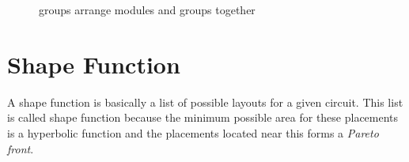 \begin{figure}
	\centering
	\caption{groups arrange modules and groups together}
	\label{fig:group_of_modules}
\end{figure}

\section{Shape Function}
A shape function is basically a list of possible layouts for a given circuit. This list is called shape function  because the minimum possible area for these placements is a hyperbolic function and the placements located near this forms a \emph{Pareto front}.

